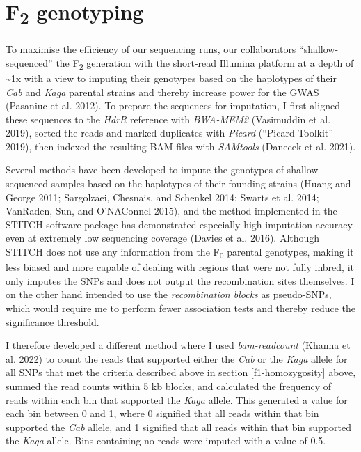 \documentclass[
]{book}
\begin{document}
\clearpage

\hypertarget{somite-f2-sequencing}{%
\section{\texorpdfstring{F\textsubscript{2} genotyping}{F2 genotyping}}\label{somite-f2-sequencing}}

To maximise the efficiency of our sequencing runs, our collaborators ``shallow-sequenced'' the F\textsubscript{2} generation with the short-read Illumina platform at a depth of \textasciitilde1x with a view to imputing their genotypes based on the haplotypes of their \emph{Cab} and \emph{Kaga} parental strains and thereby increase power for the GWAS (Pasaniuc et al. 2012). To prepare the sequences for imputation, I first aligned these sequences to the \emph{HdrR} reference with \emph{BWA-MEM2} (Vasimuddin et al. 2019), sorted the reads and marked duplicates with \emph{Picard} ({``Picard Toolkit''} 2019), then indexed the resulting BAM files with \emph{SAMtools} (Danecek et al. 2021).

Several methods have been developed to impute the genotypes of shallow-sequenced samples based on the haplotypes of their founding strains (Huang and George 2011; Sargolzaei, Chesnais, and Schenkel 2014; Swarts et al. 2014; VanRaden, Sun, and O'NAConnel 2015), and the method implemented in the STITCH software package has demonstrated especially high imputation accuracy even at extremely low sequencing coverage (Davies et al. 2016). Although STITCH does not use any information from the F\textsubscript{0} parental genotypes, making it less biased and more capable of dealing with regions that were not fully inbred, it only imputes the SNPs and does not output the recombination sites themselves. I on the other hand intended to use the \emph{recombination blocks} as pseudo-SNPs, which would require me to perform fewer association tests and thereby reduce the significance threshold.

I therefore developed a different method where I used \emph{bam-readcount} (Khanna et al. 2022) to count the reads that supported either the \emph{Cab} or the \emph{Kaga} allele for all SNPs that met the criteria described above in section \ref{f1-homozygosity} above, summed the read counts within 5 kb blocks, and calculated the frequency of reads within each bin that supported the \emph{Kaga} allele. This generated a value for each bin between 0 and 1, where 0 signified that all reads within that bin supported the \emph{Cab} allele, and 1 signified that all reads within that bin supported the \emph{Kaga} allele. Bins containing no reads were imputed with a value of 0.5.
\end{document}
